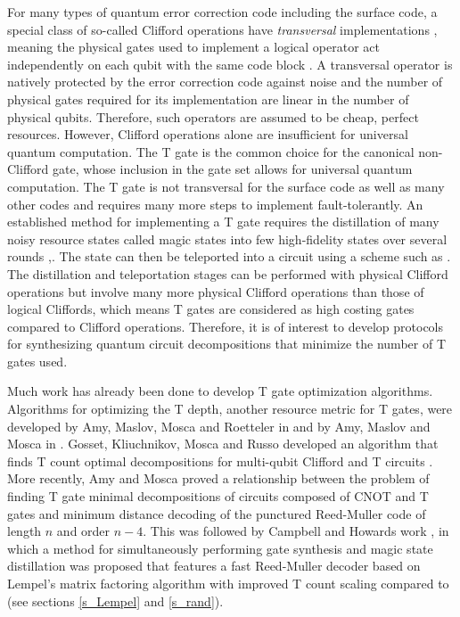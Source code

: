 \documentclass{article}
\theoremstyle{definition}
\theoremstyle{problem}
\theoremstyle{lemma}
\begin{document}
	For many types of quantum error correction code including the surface code, a special class of so-called Clifford operations have \emph{transversal} implementations \cite{38_Dennis_2001}, meaning the physical gates used to implement a logical operator act independently on each qubit with the same code block \cite{30_Gottesman_1997}. A transversal operator is natively protected by the error correction code against noise and the number of physical gates required for its implementation are linear in the number of physical qubits. Therefore, such operators are assumed to be cheap, perfect resources. However, Clifford operations alone are insufficient for universal quantum computation. The T gate is the common choice for the canonical non-Clifford gate, whose inclusion in the gate set allows for universal quantum computation. The T gate is not transversal for the surface code as well as many other codes and requires many more steps to implement fault-tolerantly. An established method for implementing a T gate requires the distillation of many noisy resource states called magic states into few high-fidelity states over several rounds \cite{32_Bravyi_2005},\cite{33_Bravyi_2012}. The state can then be teleported into a circuit using a scheme such as \cite{39_Gottesman_1999}. The distillation and teleportation stages can be performed with physical Clifford operations but involve many more physical Clifford operations than those of logical Cliffords, which means T gates are considered as high costing gates compared to Clifford operations.
	Therefore, it is of interest to develop protocols for synthesizing quantum circuit decompositions that minimize the number of T gates used.%
	
	Much work has already been done to develop T gate optimization algorithms. Algorithms for optimizing the T depth, another resource metric for T gates, were developed by Amy, Maslov, Mosca and Roetteler in \cite{3_Amy_2013} and by Amy, Maslov and Mosca in \cite{4_Amy_2013}. Gosset, Kliuchnikov, Mosca and Russo developed an algorithm that finds T count optimal decompositions for multi-qubit Clifford and T circuits \cite{5_Gosset_2013}.
	More recently, Amy and Mosca \cite{8_Amy_2016} proved a relationship between the problem of finding T gate minimal decompositions of circuits composed of CNOT and T gates and minimum distance decoding of the punctured Reed-Muller code of length $n$ and order $n-4$. This was followed by Campbell and Howards work \cite{1_Campbell_2017}, in which a method for simultaneously performing gate synthesis and magic state distillation was proposed that features a fast Reed-Muller decoder based on Lempel's matrix factoring algorithm with improved T count scaling compared to \cite{8_Amy_2016} (see sections \ref{s_Lempel} and \ref{s_rand}).
	
\end{document}
